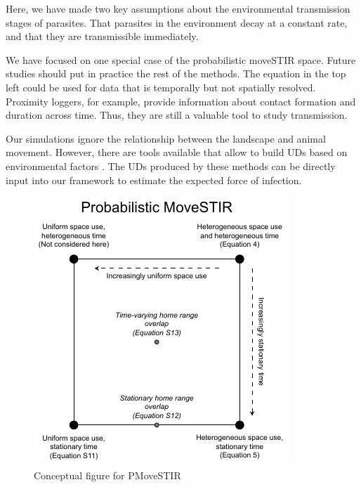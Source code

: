 \documentclass[letterpaper]{article}
\begin{document}
Here, we have made two key assumptions about the environmental transmission stages of parasites. That parasites in the environment decay at a constant rate, and that they are transmissible immediately. 


We have focused on one special case of the probabilistic moveSTIR space. Future studies should put in practice the rest of the methods. The equation in the top left could be used for data that is temporally but not spatially resolved. Proximity loggers, for example, provide information about contact formation and duration across time. Thus, they are still a valuable tool to study transmission.

Our simulations ignore the relationship between the landscape and animal movement. However, there are tools available that allow to build UDs based on environmental factors \citep{Signer2017,Michelot2020}. The UDs produced by these methods can be directly input into our framework to estimate the expected force of infection.







\begin{figure}
    \includegraphics[width=\textwidth]{figures/conceptual_figure_pmovestir.pdf}
    \caption{Conceptual figure for PMoveSTIR}
\end{figure}
\end{document}
